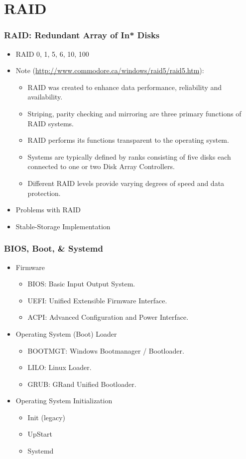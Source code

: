 \documentclass[xcolor=table, notheorems, hyperref={pdfpagelabels=false}]{beamer}
\begin{document}
\section{RAID}
\begin{frame}
\frametitle{RAID: Redundant Array of In* Disks}
\begin{itemize}
\item RAID 0, 1, 5, 6, 10, 100
\item Note (\url{http://www.commodore.ca/windows/raid5/raid5.htm}):
\begin{itemize}
\item RAID was created to enhance data performance, reliability and availability.
\item Striping, parity checking and mirroring are three primary functions of
      RAID systems.
\item RAID performs its functions transparent to the operating system.
\item Systems are typically defined by ranks consisting of five disks each
      connected to one or two Disk Array Controllers.
\item Different RAID levels provide varying degrees of speed and data protection.
\end{itemize}
\item Problems with RAID
\item Stable-Storage Implementation
\end{itemize}
\end{frame}

\begin{frame}
\frametitle{BIOS, Boot, \& Systemd}
\begin{itemize}
\item Firmware
\begin{itemize}
\item BIOS: Basic Input Output System.
\item UEFI: Unified Extensible Firmware Interface.
\item ACPI: Advanced Configuration and Power Interface.
\end{itemize}
\item Operating System (Boot) Loader
\begin{itemize}
\item BOOTMGT: Windows Bootmanager / Bootloader.
\item LILO:  Linux Loader.
\item GRUB:  GRand Unified Bootloader.
\end{itemize}
\item Operating System Initialization
\begin{itemize}
\item Init (legacy)
\item UpStart
\item Systemd
\end{itemize}
\end{itemize}
\end{frame}
\end{document}

